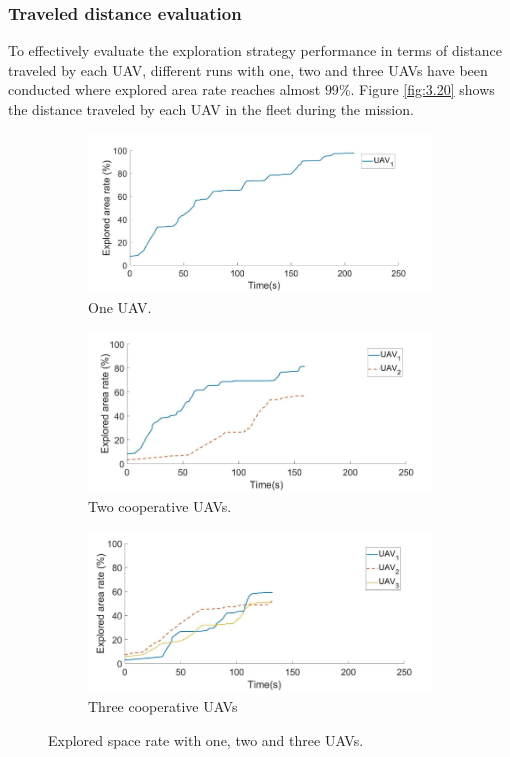 \documentclass[11pt,openany]{book}
\begin{document}
\subsubsection{Traveled distance evaluation}
To effectively evaluate the exploration strategy performance in terms of distance traveled by each UAV, different runs with one, two and three UAVs have been conducted where explored area rate reaches almost $99\%$. Figure \ref{fig:3.20} shows the distance traveled by each UAV in the ﬂeet during the mission.
\begin{figure}[H]
    \centering
    \begin{subfigure}[H]{0.7\linewidth}
        \includegraphics[width=\linewidth]{assets/3_18_a.png}
        \caption{{One UAV.}}
        \label{fig:3.18a}
    \end{subfigure}
    \begin{subfigure}[H]{0.7\linewidth}
        \includegraphics[width=\linewidth]{assets/3_18_b.png}
        \caption{{Two cooperative UAVs.}}
        \label{fig:3.18b}
    \end{subfigure}
    \begin{subfigure}[H]{0.7\linewidth}
        \includegraphics[width=\linewidth]{assets/3_18_c.png}
        \caption{{Three cooperative UAVs}}
        \label{fig:3.18c}
    \end{subfigure}
    \caption{Explored space rate with one, two and three UAVs.}
    \label{fig:3.18}
\end{figure}
\end{document}
